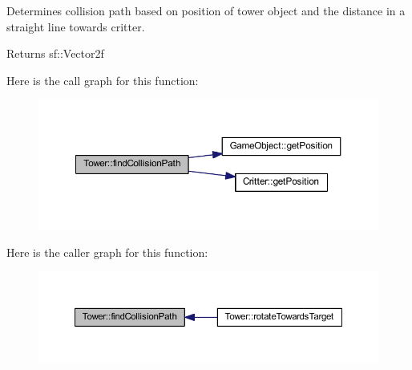 Determines collision path based on position of tower object and the distance in a straight line towards critter. 

\begin{DoxyReturn}{Returns}
sf\+::\+Vector2f 
\end{DoxyReturn}


Here is the call graph for this function\+:
\nopagebreak
\begin{figure}[H]
\begin{center}
\leavevmode
\includegraphics[width=350pt]{class_tower_acfb9cb7c1b2c1573929ff7d618aa996b_cgraph}
\end{center}
\end{figure}




Here is the caller graph for this function\+:
\nopagebreak
\begin{figure}[H]
\begin{center}
\leavevmode
\includegraphics[width=350pt]{class_tower_acfb9cb7c1b2c1573929ff7d618aa996b_icgraph}
\end{center}
\end{figure}


